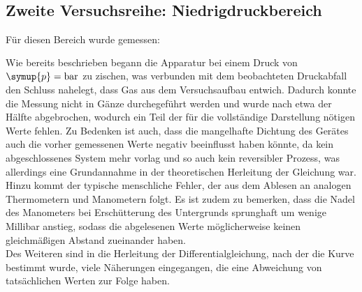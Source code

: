 \subsection{Zweite Versuchsreihe: Niedrigdruckbereich}
Für diesen Bereich wurde gemessen:
\begin{align*}

\end{align*}
\begin{align*}

\end{align*}
Wie bereits beschrieben begann die Apparatur bei einem Druck von $\symup{p} = \si{\bar}$ zu zischen, was verbunden mit dem beobachteten Druckabfall den Schluss nahelegt, dass
Gas aus dem Versuchsaufbau entwich. Dadurch konnte die Messung nicht in Gänze durchegeführt werden und wurde nach etwa der Hälfte abgebrochen, wodurch ein Teil der für die 
vollständige Darstellung nötigen Werte fehlen. Zu Bedenken ist auch, dass die mangelhafte Dichtung des Gerätes auch die vorher gemessenen Werte negativ beeinflusst haben 
könnte, da kein abgeschlossenes System mehr vorlag und so auch kein reversibler Prozess, was allerdings eine Grundannahme in der theoretischen Herleitung der Gleichung war. \\
Hinzu kommt der typische menschliche Fehler, der aus dem Ablesen an analogen Thermometern und Manometern folgt. Es ist zudem zu bemerken, dass die Nadel des Manometers bei 
Erschütterung des Untergrunds sprunghaft um wenige Millibar anstieg, sodass die abgelesenen Werte möglicherweise keinen gleichmäßigen Abstand zueinander haben. \\
Des Weiteren sind in die Herleitung der Differentialgleichung, nach der die Kurve bestimmt wurde, viele Näherungen eingegangen, die eine Abweichung von tatsächlichen Werten
zur Folge haben.
